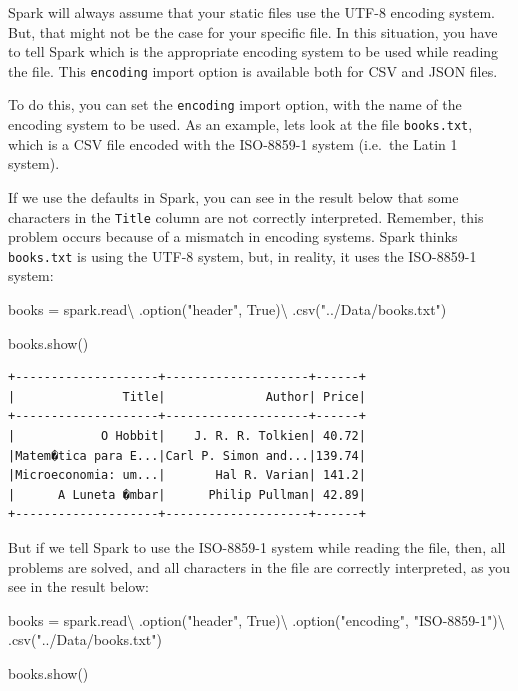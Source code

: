\documentclass[
  11pt,
  letterpaper,
  DIV=11,
  numbers=noendperiod]{scrreprt}
\newenvironment{Shaded}{\begin{snugshade}}{\end{snugshade}}
\newcommand{\NormalTok}[1]{\textcolor[rgb]{0.00,0.23,0.31}{#1}}
\newcommand{\OperatorTok}[1]{\textcolor[rgb]{0.37,0.37,0.37}{#1}}
\newcommand{\StringTok}[1]{\textcolor[rgb]{0.13,0.47,0.30}{#1}}
\newcommand{\VariableTok}[1]{\textcolor[rgb]{0.07,0.07,0.07}{#1}}
\begin{document}
Spark will always assume that your static files use the UTF-8 encoding
system. But, that might not be the case for your specific file. In this
situation, you have to tell Spark which is the appropriate encoding
system to be used while reading the file. This \texttt{encoding} import
option is available both for CSV and JSON files.

To do this, you can set the \texttt{encoding} import option, with the
name of the encoding system to be used. As an example, lets look at the
file \texttt{books.txt}, which is a CSV file encoded with the ISO-8859-1
system (i.e.~the Latin 1 system).

If we use the defaults in Spark, you can see in the result below that
some characters in the \texttt{Title} column are not correctly
interpreted. Remember, this problem occurs because of a mismatch in
encoding systems. Spark thinks \texttt{books.txt} is using the UTF-8
system, but, in reality, it uses the ISO-8859-1 system:

\begin{Shaded}
\begin{Highlighting}[]
\NormalTok{books }\OperatorTok{=}\NormalTok{ spark.read}\OperatorTok{\textbackslash{}}
\NormalTok{  .option(}\StringTok{"header"}\NormalTok{, }\VariableTok{True}\NormalTok{)}\OperatorTok{\textbackslash{}}
\NormalTok{  .csv(}\StringTok{"../Data/books.txt"}\NormalTok{)}
  
\NormalTok{books.show()}
\end{Highlighting}
\end{Shaded}

\begin{verbatim}
+--------------------+--------------------+------+
|               Title|              Author| Price|
+--------------------+--------------------+------+
|            O Hobbit|    J. R. R. Tolkien| 40.72|
|Matem�tica para E...|Carl P. Simon and...|139.74|
|Microeconomia: um...|       Hal R. Varian| 141.2|
|      A Luneta �mbar|      Philip Pullman| 42.89|
+--------------------+--------------------+------+
\end{verbatim}

But if we tell Spark to use the ISO-8859-1 system while reading the
file, then, all problems are solved, and all characters in the file are
correctly interpreted, as you see in the result below:

\begin{Shaded}
\begin{Highlighting}[]
\NormalTok{books }\OperatorTok{=}\NormalTok{ spark.read}\OperatorTok{\textbackslash{}}
\NormalTok{  .option(}\StringTok{"header"}\NormalTok{, }\VariableTok{True}\NormalTok{)}\OperatorTok{\textbackslash{}}
\NormalTok{  .option(}\StringTok{"encoding"}\NormalTok{, }\StringTok{"ISO{-}8859{-}1"}\NormalTok{)}\OperatorTok{\textbackslash{}}
\NormalTok{  .csv(}\StringTok{"../Data/books.txt"}\NormalTok{)}
  
\NormalTok{books.show()}
\end{Highlighting}
\end{Shaded}
\end{document}
